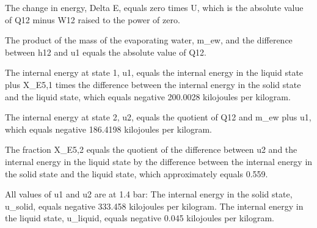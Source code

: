 The change in energy, Delta E, equals zero times U, which is the absolute value of Q12 minus W12 raised to the power of zero.

The product of the mass of the evaporating water, m_ew, and the difference between h12 and u1 equals the absolute value of Q12.

The internal energy at state 1, u1, equals the internal energy in the liquid state plus X_E5,1 times the difference between the internal energy in the solid state and the liquid state, which equals negative 200.0028 kilojoules per kilogram.

The internal energy at state 2, u2, equals the quotient of Q12 and m_ew plus u1, which equals negative 186.4198 kilojoules per kilogram.

The fraction X_E5,2 equals the quotient of the difference between u2 and the internal energy in the liquid state by the difference between the internal energy in the solid state and the liquid state, which approximately equals 0.559.

All values of u1 and u2 are at 1.4 bar:
The internal energy in the solid state, u_solid, equals negative 333.458 kilojoules per kilogram.
The internal energy in the liquid state, u_liquid, equals negative 0.045 kilojoules per kilogram.